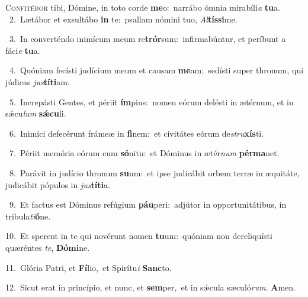 \lettrine{\initial\textcolor{\initialcolor}{C}}{onfitébor} tibi, Dómine, in toto corde \textbf{me}\-o:~\star narrábo ómnia mirabíli\textit{a} \textbf{tu}\-a.\\
{\numbfont\textcolor{\numbcolor}{~2.}}~Lætábor et exsultábo \textbf{in} te:~\star psallam nómini tuo, \textit{Al}\-\textbf{tís}\textbf{si}me.\par
{\numbfont\textcolor{\numbcolor}{~3.}}~In converténdo inimícum meum re\-\textbf{trór}\-sum:~\star infirmabúntur, et períbunt a fáci\textit{e} \textbf{tu}\-a.\par
{\numbfont\textcolor{\numbcolor}{~4.}}~Quóniam fecísti judícium meum et causam \textbf{me}\-am:~\star sedísti super thronum, qui júdicas \textit{jus}\-\textbf{tí}\textbf{ti}am.\par
{\numbfont\textcolor{\numbcolor}{~5.}}~Increpásti Gentes, et périit \textbf{ím}\-pius:~\star nomen eórum delésti in ætérnum, et in sǽcu\textit{lum} \textbf{sǽ}\-\textbf{cu}li.\par
{\numbfont\textcolor{\numbcolor}{~6.}}~Inimíci defecérunt frámeæ in \textbf{fi}\-nem:~\star et civitátes eórum de\-\textit{stru}\-\textbf{xís}ti.\par
{\numbfont\textcolor{\numbcolor}{~7.}}~Périit memória eórum cum \textbf{só}\-nitu:~\star et Dóminus in ætér\textit{num} \textbf{pér}\-\textbf{ma}net.\par
{\numbfont\textcolor{\numbcolor}{~8.}}~Parávit in judício thronum \textbf{su}\-um:~\star et ipse judicábit orbem terræ in æquitáte, judicábit pópulos in \textit{jus}\-\textbf{tí}\textbf{ti}a.\par
{\numbfont\textcolor{\numbcolor}{~9.}}~Et factus est Dóminus refúgium \textbf{páu}\-peri:~\star adjútor in opportunitátibus, in tribula\-\textit{ti}\-\textbf{ó}ne.\par
{\numbfont\textcolor{\numbcolor}{10.}}~Et sperent in te qui novérunt nomen \textbf{tu}\-um:~\star quóniam non dereliquísti quæréntes \textit{te}\-, \textbf{Dó}\-\textbf{mi}ne.\par
{\numbfont\textcolor{\numbcolor}{11.}}~Glória Patri, et \textbf{Fí}\-lio,~\star et Spirítu\textit{i} \textbf{Sanc}\-to.\par
{\numbfont\textcolor{\numbcolor}{12.}}~Sicut erat in princípio, et nunc, et \textbf{sem}\-per,~\star et in sǽcula sæculó\-\textit{rum}\-. \textbf{A}\-men.\par

